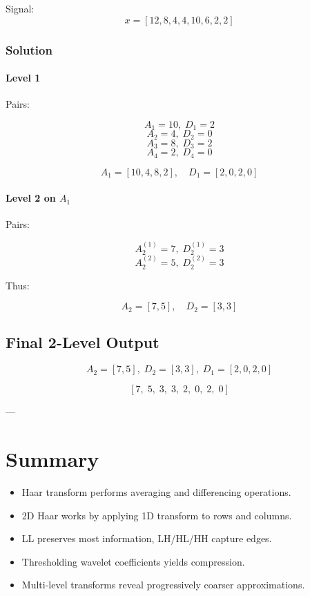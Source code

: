 \documentclass{AnantDocumentation}
\begin{document}
Signal:
\[
x = [12, 8, 4, 4, 10, 6, 2, 2]
\]

\subsubsection*{Solution}

\paragraph{Level 1}

Pairs:

\[
A_1 = 10,\; D_1 = 2
\]
\[
A_2 = 4,\; D_2 = 0
\]
\[
A_3 = 8,\; D_3 = 2
\]
\[
A_4 = 2,\; D_4 = 0
\]

\[
A_1 = [10,4,8,2],\quad D_1 = [2,0,2,0]
\]

\paragraph{Level 2 on $A_1$}

Pairs:

\[
A_2^{(1)} = 7,\; D_2^{(1)} = 3
\]
\[
A_2^{(2)} = 5,\; D_2^{(2)} = 3
\]

Thus:

\[
A_2 = [7,5],\quad D_2 = [3,3]
\]

\subsection*{Final 2-Level Output}

\[
\boxed{
A_2 = [7,5],\;
D_2 = [3,3],\;
D_1 = [2,0,2,0]
}
\]

\[
\boxed{
[7,\;5,\;3,\;3,\;2,\;0,\;2,\;0]
}
\]

---

\section*{Summary}

\begin{itemize}
\item Haar transform performs averaging and differencing operations.
\item 2D Haar works by applying 1D transform to rows and columns.
\item LL preserves most information, LH/HL/HH capture edges.
\item Thresholding wavelet coefficients yields compression.
\item Multi-level transforms reveal progressively coarser approximations.
\end{itemize}
\end{document}
